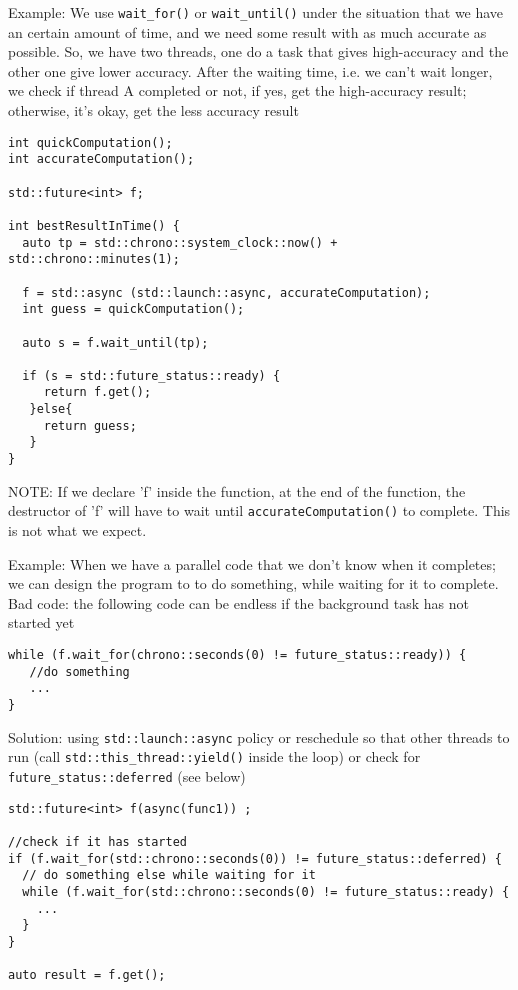 Example: We use \verb!wait_for()! or \verb!wait_until()! under the situation
that we have an certain amount of time, and we need some result with as much
accurate as possible. So, we have two threads, one do a task that
gives high-accuracy and the other one give lower accuracy. After the waiting
time, i.e. we can't wait longer, we check if thread A completed or not, if yes,
get the high-accuracy result; otherwise, it's okay, get the less accuracy result
\begin{lstlisting}
int quickComputation();
int accurateComputation();

std::future<int> f;  

int bestResultInTime() {
  auto tp = std::chrono::system_clock::now() + std::chrono::minutes(1);
  
  f = std::async (std::launch::async, accurateComputation);
  int guess = quickComputation();
  
  auto s = f.wait_until(tp);
  
  if (s = std::future_status::ready) {
     return f.get();
   }else{
     return guess;
   }
}
\end{lstlisting}
NOTE: If we declare 'f' inside the function, at the end of the function, the
destructor of 'f' will have to wait until \verb!accurateComputation()! to
complete. This is not what we expect.

Example: When we have a parallel code that we don't know when it completes; we
can design the program to to do something, while waiting for it to complete.
Bad code: the following code can be endless if the background task has not
started yet
\begin{lstlisting}
while (f.wait_for(chrono::seconds(0) != future_status::ready)) {
   //do something
   ...
}
\end{lstlisting}
Solution: using \verb!std::launch::async! policy or reschedule so that other
threads to run (call \verb!std::this_thread::yield()! inside the loop) or check
for \verb!future_status::deferred! (see below)
\begin{lstlisting}
std::future<int> f(async(func1)) ; 

//check if it has started
if (f.wait_for(std::chrono::seconds(0)) != future_status::deferred) {
  // do something else while waiting for it
  while (f.wait_for(std::chrono::seconds(0) != future_status::ready) {
    ...
  }
}

auto result = f.get();
\end{lstlisting}


